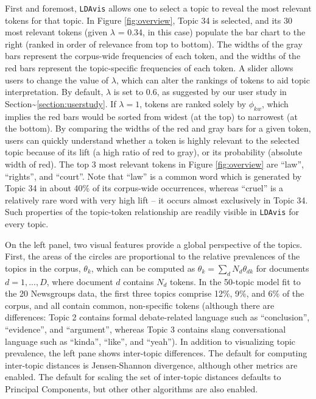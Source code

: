 \documentclass[12pt,]{isuthesis}
\begin{document}
First and foremost, \texttt{LDAvis} allows one to select a topic to
reveal the most relevant tokens for that topic. In Figure
\ref{fig:overview}, Topic 34 is selected, and its 30 most relevant
tokens (given \(\lambda\) = 0.34, in this case) populate the bar chart
to the right (ranked in order of relevance from top to bottom). The
widths of the gray bars represent the corpus-wide frequencies of each
token, and the widths of the red bars represent the topic-specific
frequencies of each token. A slider allows users to change the value of
\(\lambda\), which can alter the rankings of tokens to aid topic
interpretation. By default, \(\lambda\) is set to 0.6, as suggested by
our user study in Section\textasciitilde{}\ref{section:userstudy}. If
\(\lambda = 1\), tokens are ranked solely by \(\phi_{kw}\), which
implies the red bars would be sorted from widest (at the top) to
narrowest (at the bottom). By comparing the widths of the red and gray
bars for a given token, users can quickly understand whether a token is
highly relevant to the selected topic because of its lift (a high ratio
of red to gray), or its probability (absolute width of red). The top 3
most relevant tokens in Figure \ref{fig:overview} are ``law'',
``rights'', and ``court''. Note that ``law'' is a common word which is
generated by Topic 34 in about 40\% of its corpus-wide occurrences,
whereas ``cruel'' is a relatively rare word with very high lift -- it
occurs almost exclusively in Topic 34. Such properties of the
topic-token relationship are readily visible in \texttt{LDAvis} for
every topic.

On the left panel, two visual features provide a global perspective of
the topics. First, the areas of the circles are proportional to the
relative prevalences of the topics in the corpus, \(\theta_k\), which
can be computed as \(\theta_k = \sum_d N_d\theta_{dk}\) for documents
\(d = 1, ..., D\), where document \(d\) contains \(N_d\) tokens. In the
50-topic model fit to the 20 Newsgroups data, the first three topics
comprise 12\%, 9\%, and 6\% of the corpus, and all contain common,
non-specific tokens (although there are differences: Topic 2 contains
formal debate-related language such as ``conclusion'', ``evidence'', and
``argument'', whereas Topic 3 contains slang conversational language
such as ``kinda'', ``like'', and ``yeah''). In addition to visualizing
topic prevalence, the left pane shows inter-topic differences. The
default for computing inter-topic distances is Jensen-Shannon
divergence, although other metrics are enabled. The default for scaling
the set of inter-topic distances defaults to Principal Components, but
other other algorithms are also enabled.
\end{document}
